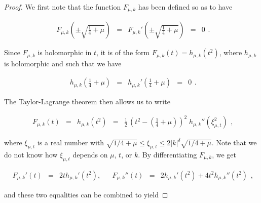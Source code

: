 \documentclass{jams-l}
\theoremstyle{definition}
\theoremstyle{remark}
\numberwithin{equation}{section}
\begin{document}
            \begin{proof}
        
                We first note that the function $F_{\mu,k}$ has been defined so as to have
            
                \[ \begin{array}{lllll}
                        F_{\mu,k} \left( \pm \sqrt{\frac{1}{4}+\mu} \right) & = & F_{\mu,k}' \left( \pm \sqrt{\frac{1}{4}+\mu} \right) & = & 0
                    \end{array} . \]
            
                \noindent Since $F_{\mu,k}$ is holomorphic in $t$, it is of the form $F_{\mu,k} \left( t \right)= h_{\mu,k} \left( t^2 \right)$, where $h_{\mu,k}$ is holomorphic and such that we have
            
                \[ \begin{array}{lllll}
                        h_{\mu,k} \left( \frac{1}{4}+\mu \right) & = & h_{\mu,k}' \left( \frac{1}{4}+\mu \right) & = & 0
                    \end{array} . \]
            
                \noindent The Taylor-Lagrange theorem then allows us to write
            
                \[ \begin{array}{lllll}
                        F_{\mu,k} \left( t \right) & = & h_{\mu,k} \left( t^2 \right) & = & \frac{1}{2} \, \left( t^2 - \left( \frac{1}{4}+\mu \right) \right)^2 \; h_{\mu,k}'' \left( \xi_{\mu,t}^2 \right)
                    \end{array} , \]
            
                \noindent where $\xi_{\mu,t}$ is a real number with $\sqrt{1/4 + \mu} \leqslant \xi_{\mu,t} \leqslant 2 \left \vert k \right \vert^{\delta} \sqrt{1/4 + \mu}$. Note that we do not know how $\xi_{\mu,t}$ depends on $\mu$, $t$, or $k$. By differentiating $F_{\mu,k}$, we get
            
                \[ \begin{array}{lllclll}
                        F_{\mu,k}' \left( t \right) & = & 2t h_{\mu,k}' \left( t^2 \right), & & F_{\mu,k}'' \left( t \right) & = & 2 h_{\mu,k}' \left( t^2 \right) + 4t^2 h_{\mu,k}'' \left( t^2 \right)
                    \end{array} , \]
            
                \noindent and these two equalities can be combined to yield
            

\end{proof}
\end{document}
